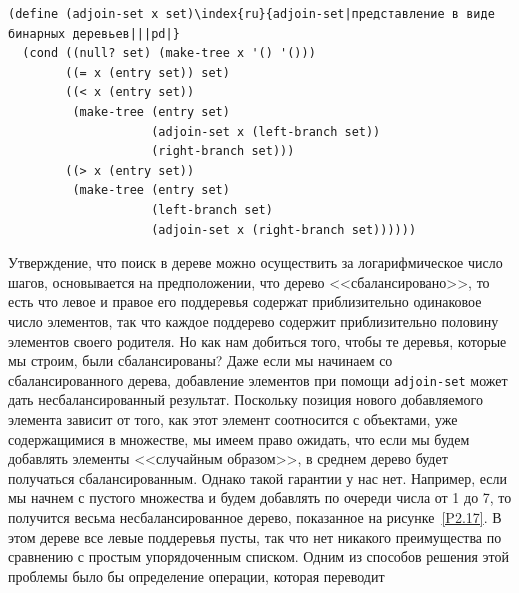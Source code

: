 \begin{Verbatim}[fontsize=\small]
(define (adjoin-set x set)\index{ru}{adjoin-set|представление в виде бинарных деревьев|||pd|}
  (cond ((null? set) (make-tree x '() '()))
        ((= x (entry set)) set)
        ((< x (entry set))
         (make-tree (entry set) 
                    (adjoin-set x (left-branch set))
                    (right-branch set)))
        ((> x (entry set))
         (make-tree (entry set)
                    (left-branch set)
                    (adjoin-set x (right-branch set))))))
\end{Verbatim}

Утверждение, что поиск в дереве можно осуществить за
логарифмическое \linebreak
число шагов, основывается на предположении, что дерево 
<<сбалансировано>>, \linebreak
  то есть что левое и правое его поддеревья содержат
приблизительно одинаковое \linebreak
число элементов, так что каждое поддерево
содержит приблизительно \linebreak
половину элементов своего родителя.  Но как
нам добиться того, чтобы те \linebreak
деревья, которые мы строим, были
сбалансированы?  Даже если мы начинаем со \linebreak
сбалансированного дерева,
добавление элементов при помощи {\tt adjoin-set} может дать
несбалансированный результат.  Поскольку позиция нового добавляемого
элемента зависит от того, как этот элемент соотносится с объектами,
уже содержащимися в множестве, мы имеем право ожидать, 
что если мы
будем добавлять элементы <<случайным образом>>, в среднем дерево 
будет 
получаться сбалансированным.  \linebreak
Однако такой гарантии у нас нет.
Например, если мы начнем с пустого \linebreak
 множества и будем добавлять по
очереди числа от 1 до 7, то получится весьма \linebreak
несбалансированное
дерево, показанное на рисунке~\ref{P2.17}.  В этом дереве все \linebreak
левые поддеревья пусты, так что нет никакого преимущества по
сравнению с \linebreak
простым упорядоченным списком.  Одним из способов решения
этой проблемы было бы определение операции, которая переводит
